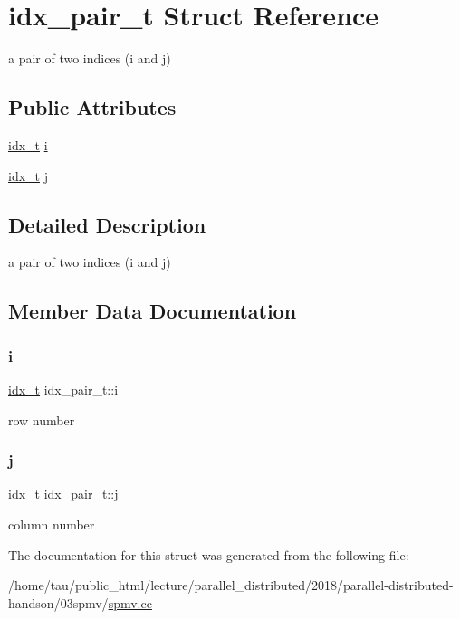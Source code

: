 \hypertarget{structidx__pair__t}{}\section{idx\+\_\+pair\+\_\+t Struct Reference}
\label{structidx__pair__t}


a pair of two indices (i and j)  


\subsection*{Public Attributes}
\begin{DoxyCompactItemize}
\item 
\hyperlink{spmv_8cc_a8e93478a00e685bea5e6a3f617bf03a3}{idx\+\_\+t} \hyperlink{structidx__pair__t_a5fc2a45497e05f6b02ae6dddd4cc5a14}{i}
\item 
\hyperlink{spmv_8cc_a8e93478a00e685bea5e6a3f617bf03a3}{idx\+\_\+t} \hyperlink{structidx__pair__t_afa260eb03684e5ae1c067c13fd33f3e0}{j}
\end{DoxyCompactItemize}


\subsection{Detailed Description}
a pair of two indices (i and j) 

\subsection{Member Data Documentation}
\mbox{\label{structidx__pair__t_a5fc2a45497e05f6b02ae6dddd4cc5a14}} 
\subsubsection{\texorpdfstring{i}{i}}
{\footnotesize\ttfamily \hyperlink{spmv_8cc_a8e93478a00e685bea5e6a3f617bf03a3}{idx\+\_\+t} idx\+\_\+pair\+\_\+t\+::i}

row number \mbox{\label{structidx__pair__t_afa260eb03684e5ae1c067c13fd33f3e0}} 
\subsubsection{\texorpdfstring{j}{j}}
{\footnotesize\ttfamily \hyperlink{spmv_8cc_a8e93478a00e685bea5e6a3f617bf03a3}{idx\+\_\+t} idx\+\_\+pair\+\_\+t\+::j}

column number 

The documentation for this struct was generated from the following file\+:\begin{DoxyCompactItemize}
\item 
/home/tau/public\+\_\+html/lecture/parallel\+\_\+distributed/2018/parallel-\/distributed-\/handson/03spmv/\hyperlink{spmv_8cc}{spmv.\+cc}\end{DoxyCompactItemize}
